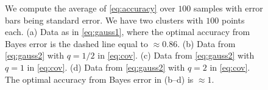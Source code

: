 \documentclass[aps,preprint,nofootinbib,floatfix]{revtex4-1}
\begin{document}
\begin{figure}
{%
We compute the average of \eqref{eq:accuracy} over $100$ samples with
error bars being standard error. We have two clusters with $100$ points
each. 
(a) Data as in \eqref{eq:gauss1}, where the optimal accuracy
from Bayes error is the dashed line equal to $\approx 0.86$.
(b) Data from \eqref{eq:gauss2} with $q=1/2$ in \eqref{eq:cov}. 
(c) Data from \eqref{eq:gauss2} with $q=1$ in \eqref{eq:cov}.
(d) Data from \eqref{eq:gauss2} with $q=2$ in \eqref{eq:cov}.
The optimal accuracy from Bayes error in (b--d) is $\approx 1$.
}
\end{figure}
\end{document}
